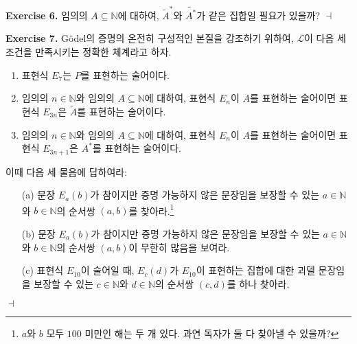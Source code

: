 \documentclass[12pt]{paper}
\newenvironment{context}[1][]{\noindent \textbf{{#1}.}}{\hfill $ \dashv $}
\begin{document}
  \begin{context}[Exercise 6]
    임의의 $A \subseteq \mathbb{N}$에 대하여,
    $\tilde{A}^{*}$와 $\widetilde{A^{*}}$가 같은 집합일 필요가 있을까?
  \end{context}

  \begin{context}[Exercise 7]
    G\"odel의 증명의 온전히 구성적인 본질을 강조하기 위하여,
    $\mathcal{L}$이 다음 세 조건을 만족시키는 정확한 체계라고 하자.
    \begin{enumerate}
      \item 표현식 $E_{7}$는 $P$를 표현하는 술어이다.
      \item 임의의 $n \in \mathbb{N}$와 임의의 $A \subseteq \mathbb{N}$에 대하여, 표현식 $E_{n}$이 $A$를 표현하는 술어이면 표현식 $E_{3 n}$은 $\tilde{A}$를 표현하는 술어이다.
      \item 임의의 $n \in \mathbb{N}$와 임의의 $A \subseteq \mathbb{N}$에 대하여, 표현식 $E_{n}$이 $A$를 표현하는 술어이면 표현식 $E_{3 n + 1}$은 $A^{*}$를 표현하는 술어이다.
    \end{enumerate}
    
    이때 다음 세 물음에 답하여라:
    \begin{itemize}
      \item[(a)] 문장 $E_{a} \left( b \right)$가 참이지만 증명 가능하지 않은 문장임을 보장할 수 있는 $a \in \mathbb{N}$와 $b \in \mathbb{N}$의 순서쌍 $\left( a , b \right)$를 찾아라.\footnote
      {
        $a$와 $b$ 모두 $100$ 미만인 해는 두 개 있다.
        과연 독자가 둘 다 찾아낼 수 있을까?
      }
      \item[(b)] 문장 $E_{a} \left( b \right)$가 참이지만 증명 가능하지 않은 문장임을 보장할 수 있는 $a \in \mathbb{N}$와 $b \in \mathbb{N}$의 순서쌍 $\left( a , b \right)$이 무한히 많음을 보여라.
      \item[(c)] 표현식 $E_{10}$이 술어일 때, $E_{c} \left( d \right)$가 $E_{10}$이 표현하는 집합에 대한 괴델 문장임을 보장할 수 있는 $c \in \mathbb{N}$와 $d \in \mathbb{N}$의 순서쌍 $\left( c , d \right)$를 하나 찾아라.
    \end{itemize}
  \end{context}
\end{document}
